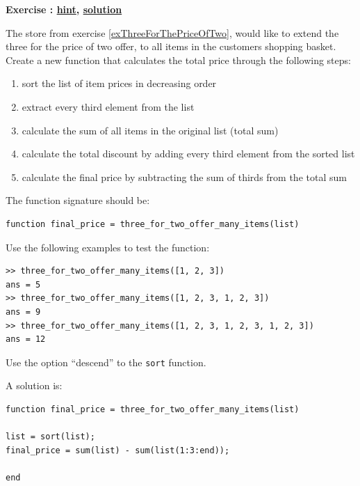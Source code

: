 \documentclass[12pt,a4paper]{article}
\makeatletter
\newcommand{\linkdest}[1]{\Hy@raisedlink{\hypertarget{#1}{}}}
\newcounter{ex}
\numberwithin{ex}{section}
\newenvironment{ex}[1][]{%
\filbreak
\bigskip
\refstepcounter{ex}
\noindent
\textbf{\linkdest{\theex{}exercise}{}Exercise \theex{}: #1\hfill\hyperlink{\theex{}hint}{hint}, \hyperlink{\theex{}solution}{solution}}\par\noindent}{}
\makeatother
\begin{document}
\begin{ex}
The store from exercise \ref{exThreeForThePriceOfTwo}, would like
to extend the three for the price of two offer, to all items
in the customers shopping basket.
Create a new function that calculates the total price through 
the following steps:
\begin{enumerate}
\item	sort the list of item prices in decreasing order
\item	extract every third element from the list
\item	calculate the sum of all items in the original list (total sum)
\item	calculate the total discount by adding every third element from the sorted list
\item 	calculate the final price by subtracting the sum of thirds from the total sum
\end{enumerate}
The function signature should be:
\begin{lstlisting}
function final_price = three_for_two_offer_many_items(list)
\end{lstlisting}
Use the following examples to test the function:
\begin{lstlisting}
>> three_for_two_offer_many_items([1, 2, 3])
ans = 5
>> three_for_two_offer_many_items([1, 2, 3, 1, 2, 3])
ans = 9
>> three_for_two_offer_many_items([1, 2, 3, 1, 2, 3, 1, 2, 3])
ans = 12
\end{lstlisting}
\begin{hint}
Use the option ``descend'' to the \verb!sort! function.
\end{hint}
\begin{sol}
A solution is:
\begin{lstlisting}
function final_price = three_for_two_offer_many_items(list)

list = sort(list);
final_price = sum(list) - sum(list(1:3:end));

end
\end{lstlisting}
\end{sol}
\end{ex}
\end{document}
